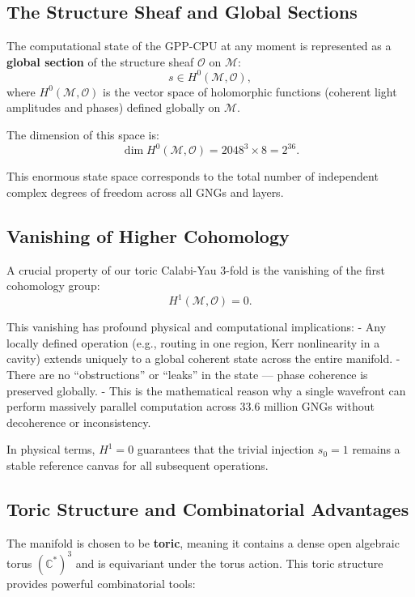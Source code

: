 \subsection{The Structure Sheaf and Global Sections}

The computational state of the GPP-CPU at any moment is represented as a \textbf{global section} of the structure sheaf \(\mathcal{O}\) on \(\mathcal{M}\):
\[
s \in H^0(\mathcal{M}, \mathcal{O}),
\]
where \(H^0(\mathcal{M}, \mathcal{O})\) is the vector space of holomorphic functions (coherent light amplitudes and phases) defined globally on \(\mathcal{M}\).

The dimension of this space is:
\[
\dim H^0(\mathcal{M}, \mathcal{O}) = 2048^3 \times 8 = 2^{36}.
\]

This enormous state space corresponds to the total number of independent complex degrees of freedom across all GNGs and layers.

\subsection{Vanishing of Higher Cohomology}

A crucial property of our toric Calabi-Yau 3-fold is the vanishing of the first cohomology group:
\[
H^1(\mathcal{M}, \mathcal{O}) = 0.
\]

This vanishing has profound physical and computational implications:
- Any locally defined operation (e.g., routing in one region, Kerr nonlinearity in a cavity) extends uniquely to a global coherent state across the entire manifold.
- There are no ``obstructions'' or ``leaks'' in the state — phase coherence is preserved globally.
- This is the mathematical reason why a single wavefront can perform massively parallel computation across 33.6 million GNGs without decoherence or inconsistency.

In physical terms, \(H^1 = 0\) guarantees that the trivial injection \(s_0 = 1\) remains a stable reference canvas for all subsequent operations.

\subsection{Toric Structure and Combinatorial Advantages}

The manifold is chosen to be \textbf{toric}, meaning it contains a dense open algebraic torus \((\mathbb{C}^*)^3\) and is equivariant under the torus action. This toric structure provides powerful combinatorial tools:

